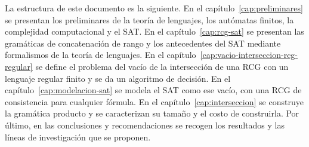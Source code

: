 \documentclass{report}
\begin{document}
La estructura de este documento es la siguiente. En el
capítulo~\ref{cap:preliminares} se presentan los preliminares de la
teoría de lenguajes, los autómatas finitos, la complejidad computacional
y el SAT. En el capítulo~\ref{cap:rcg-sat} se presentan las gramáticas de
concatenación de rango y los antecedentes del SAT mediante formalismos de
la teoría de lenguajes. En el capítulo~\ref{cap:vacio-interseccion-rcg-regular}
se define el problema del vacío de la intersección de una RCG con un
lenguaje regular finito y se da un algoritmo de decisión. En el
capítulo~\ref{cap:modelacion-sat} se modela el SAT como ese vacío, con una
RCG de consistencia para cualquier fórmula. En el
capítulo~\ref{cap:interseccion} se construye la gramática producto y se
caracterizan su tamaño y el costo de construirla. Por último, en las
conclusiones y recomendaciones se recogen los resultados y las líneas de
investigación que se proponen.



\end{document}
